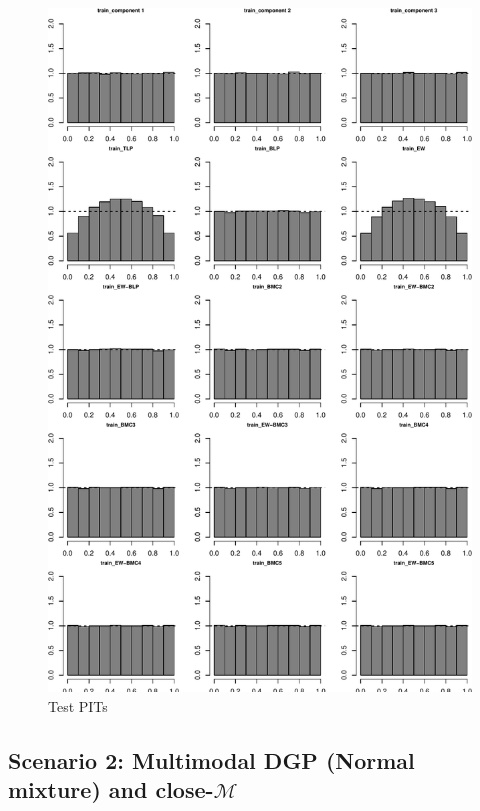 \documentclass[
]{article}
\begin{document}
\begin{figure}[h]

{\centering \includegraphics{applied_blp_sim_files/figure-latex/unnamed-chunk-6-1} 

}

\caption{Test PITs}\label{fig:unnamed-chunk-6}
\end{figure}

\clearpage

\hypertarget{scenario-2-multimodal-dgp-normal-mixture-and-close-mathcalm}{%
\subsection{\texorpdfstring{Scenario 2: Multimodal DGP (Normal mixture)
and
close-\(\mathcal{M}\)}{Scenario 2: Multimodal DGP (Normal mixture) and close-\textbackslash mathcal\{M\}}}\label{scenario-2-multimodal-dgp-normal-mixture-and-close-mathcalm}}
\end{document}
